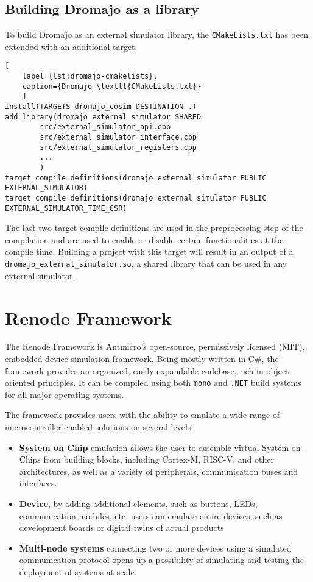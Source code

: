\subsection{Building Dromajo as a library}

To build Dromajo as an external simulator library, the \texttt{CMakeLists.txt} has been extended with an additional
target:

\begin{lstlisting}[
    label={lst:dromajo-cmakelists},
    caption={Dromajo \texttt{CMakeLists.txt}}
    ]
install(TARGETS dromajo_cosim DESTINATION .)
add_library(dromajo_external_simulator SHARED
        src/external_simulator_api.cpp
        src/external_simulator_interface.cpp
        src/external_simulator_registers.cpp
        ...
        )
target_compile_definitions(dromajo_external_simulator PUBLIC EXTERNAL_SIMULATOR)
target_compile_definitions(dromajo_external_simulator PUBLIC EXTERNAL_SIMULATOR_TIME_CSR)
\end{lstlisting}

\noindent
The last two target compile definitions are used in the preprocessing step of the compilation and are used to enable
or disable certain functionalities at the compile time. Building a project with this target will result in an output
of a \texttt{dromajo\_external\_simulator.so}, a shared library that can be used in any external simulator.

\pagebreak

\section{Renode Framework}
The Renode Framework is Antmicro's open-source, permissively licensed (MIT), embedded device simulation framework.
Being mostly written in C\#, the framework provides an organized, easily expandable codebase, rich in
object-oriented principles. It can be compiled using both \texttt{mono} and \texttt{.NET} build systems for
all major operating systems.

The framework provides users with the ability to emulate a wide range of microcontroller-enabled solutions on several levels:
\begin{itemize}
    \item{\textbf{System on Chip} emulation allows the user to assemble virtual System-on-Chips from building blocks,
    including Cortex-M, RISC-V, and other architectures, as well as a variety of peripherals, communication buses and interfaces.}
    \item{\textbf{Device}, by adding additional elements, such as buttons, LEDs, communication modules, etc. users can
    emulate entire devices, such as development boards or digital twins of actual products}
    \item{\textbf{Multi-node systems} connecting two or more devices using a simulated communication protocol opens
    up a possibility of simulating and testing the deployment of systems at scale.}
\end{itemize}

